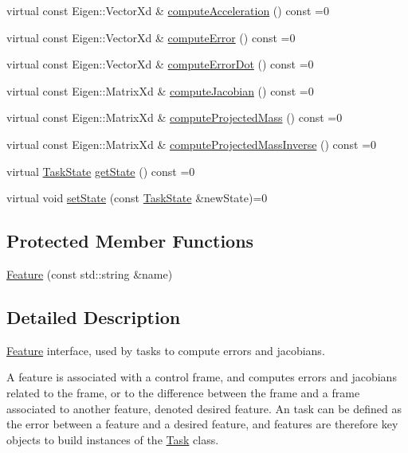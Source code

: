\begin{DoxyCompactItemize}
\item 
virtual const Eigen\+::\+Vector\+Xd \& \hyperlink{classocra_1_1Feature_aa42b61d4255116caa92042d01ca36b79}{compute\+Acceleration} () const =0
\item 
virtual const Eigen\+::\+Vector\+Xd \& \hyperlink{classocra_1_1Feature_a88f87b496aedc7bf9f13b19bb8f9c7fa}{compute\+Error} () const =0
\item 
virtual const Eigen\+::\+Vector\+Xd \& \hyperlink{classocra_1_1Feature_a01a4870418ba87d5b41d8f917c1255fc}{compute\+Error\+Dot} () const =0
\item 
virtual const Eigen\+::\+Matrix\+Xd \& \hyperlink{classocra_1_1Feature_adbab3b388657555abb805bb971c2491f}{compute\+Jacobian} () const =0
\item 
virtual const Eigen\+::\+Matrix\+Xd \& \hyperlink{classocra_1_1Feature_a99ac023809c0cf34b5d582537934b08c}{compute\+Projected\+Mass} () const =0
\item 
virtual const Eigen\+::\+Matrix\+Xd \& \hyperlink{classocra_1_1Feature_ac27bcbdbb8541e3b4e2c77a6d6f2ffc0}{compute\+Projected\+Mass\+Inverse} () const =0
\item 
virtual \hyperlink{classocra_1_1TaskState}{Task\+State} \hyperlink{classocra_1_1Feature_a792434ceb793f25874b8fe42ae24c475}{get\+State} () const =0
\item 
virtual void \hyperlink{classocra_1_1Feature_ad16d6b176b229280649ab405531e9a30}{set\+State} (const \hyperlink{classocra_1_1TaskState}{Task\+State} \&new\+State)=0
\end{DoxyCompactItemize}
\subsection*{Protected Member Functions}
\begin{DoxyCompactItemize}
\item 
\hyperlink{classocra_1_1Feature_ad0c940337cd0716bd8f45b63b03dd704}{Feature} (const std\+::string \&name)
\end{DoxyCompactItemize}


\subsection{Detailed Description}
\hyperlink{classocra_1_1Feature}{Feature} interface, used by tasks to compute errors and jacobians. 

A feature is associated with a control frame, and computes errors and jacobians related to the frame, or to the \textquotesingle{}difference\textquotesingle{} between the frame and a frame associated to another feature, denoted \textquotesingle{}desired feature\textquotesingle{}. An task can be defined as the error between a feature and a desired feature, and features are therefore key objects to build instances of the \hyperlink{classocra_1_1Task}{Task} class.

